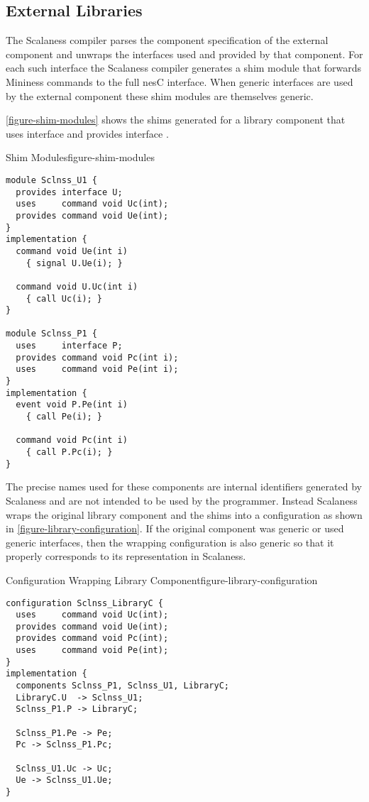 
\subsection{External Libraries}
\label{section-external-libraries-implementation}

 The Scalaness compiler parses the component
specification of the external component and unwraps the interfaces used and provided by that
component. For each such interface the Scalaness compiler generates a shim module that forwards
Mininess commands to the full nesC interface. When generic interfaces are used by the external
component these shim modules are themselves generic.

\autoref{figure-shim-modules} shows the shims generated for a library component
 that uses interface  and provides interface .

\singlespace
\begin{fpfig}[tbhp]{Shim Modules}{figure-shim-modules}
{
\begin{lstlisting}[language=nesC]
module Sclnss_U1 {
  provides interface U;
  uses     command void Uc(int);
  provides command void Ue(int);
}
implementation {
  command void Ue(int i)
    { signal U.Ue(i); }

  command void U.Uc(int i)
    { call Uc(i); }
}

module Sclnss_P1 {
  uses     interface P;
  provides command void Pc(int i);
  uses     command void Pe(int i);
}
implementation {
  event void P.Pe(int i)
    { call Pe(i); }

  command void Pc(int i)
    { call P.Pc(i); }
}
\end{lstlisting}
}
\end{fpfig}
\primaryspacing

The precise names used for these components are internal identifiers generated by Scalaness and
are not intended to be used by the programmer. Instead Scalaness wraps the original library
component and the shims into a configuration as shown in \autoref{figure-library-configuration}.
If the original component was generic or used generic interfaces, then the wrapping
configuration is also generic so that it properly corresponds to its representation in
Scalaness.

\singlespace
\begin{fpfig}[tbhp]{Configuration Wrapping Library Component}{figure-library-configuration}
{
\begin{lstlisting}[language=nesC]
configuration Sclnss_LibraryC {
  uses     command void Uc(int);
  provides command void Ue(int);
  provides command void Pc(int);
  uses     command void Pe(int);
}
implementation {
  components Sclnss_P1, Sclnss_U1, LibraryC;
  LibraryC.U  -> Sclnss_U1;
  Sclnss_P1.P -> LibraryC;

  Sclnss_P1.Pe -> Pe;
  Pc -> Sclnss_P1.Pc;
  
  Sclnss_U1.Uc -> Uc;
  Ue -> Sclnss_U1.Ue;
}
\end{lstlisting}
}
\end{fpfig}
\primaryspacing

